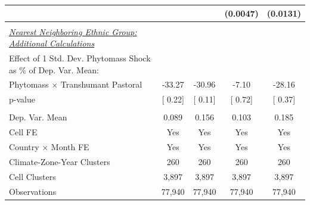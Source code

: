 {\begin{tabular}{l*{4}{c}}
                    &               &               &(0.0047)         &(0.0131)         \\
\midrule
\\ \underline{\emph{Nearest Neighboring Ethnic Group: Additional Calculations}} &               &               &               &               \\
[1em] Effect of 1 Std. Dev. Phytomass Shock as $\%$ of Dep. Var. Mean:&               &               &               &               \\
[1em] \hspace{15pt} Phytomass $\times$ Transhumant Pastoral&-33.27         &-30.96         & -7.10         &-28.16         \\
\hspace{15pt} p-value&[     0.22]         &[     0.11]         &[     0.72]         &[     0.37]         \\
\hline \\ Dep. Var. Mean& 0.089         & 0.156         & 0.103         & 0.185         \\
Cell FE             &   Yes         &   Yes         &   Yes         &   Yes         \\
Country $\times$ Month FE&   Yes         &   Yes         &   Yes         &   Yes         \\
Climate-Zone-Year Clusters&   260         &   260         &   260         &   260         \\
Cell Clusters       & 3,897         & 3,897         & 3,897         & 3,897         \\
Observations        &77,940         &77,940         &77,940         &77,940         \\
\bottomrule
\end{tabular}
}
